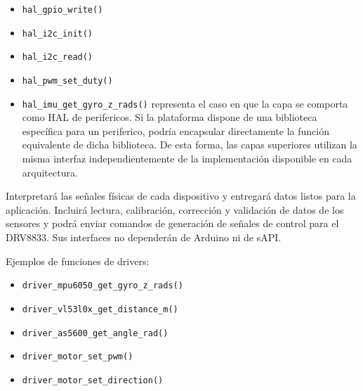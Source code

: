 \begin{description}
\begin{visar}
\begin{itemize}
  \item \texttt{hal\_gpio\_write()} 

  \item \texttt{hal\_i2c\_init()} 

  \item \texttt{hal\_i2c\_read()} 

  \item \texttt{hal\_pwm\_set\_duty()} 


  \item \texttt{hal\_imu\_get\_gyro\_z\_rads()} representa el caso en que la capa se comporta como HAL de perifericos. Si la plataforma dispone de una
        biblioteca específica para un periferico, podría encapsular directamente
        la función equivalente de dicha biblioteca. De esta forma, las capas
        superiores utilizan la misma interfaz independientemente de la
        implementación disponible en cada arquitectura.

\end{itemize}
        \end{visar}


  \item[Capa 2 --- Drivers de dispositivos.]
        Interpretará las señales físicas de cada dispositivo y entregará datos
        listos para la aplicación. Incluirá lectura, calibración, corrección y
        validación de datos de los sensores y podrá enviar comandos de
        generación de señales de control para el DRV8833. Sus interfaces no
        dependerán de Arduino ni de sAPI.

        \begin{visar}
Ejemplos de funciones de drivers:
\begin{itemize}

  \item \texttt{driver\_mpu6050\_get\_gyro\_z\_rads()}

  \item \texttt{driver\_vl53l0x\_get\_distance\_m()}

  \item \texttt{driver\_as5600\_get\_angle\_rad()} 

  \item \texttt{driver\_motor\_set\_pwm()}

  \item \texttt{driver\_motor\_set\_direction()}

\end{itemize}
        \end{visar}



\end{description}
